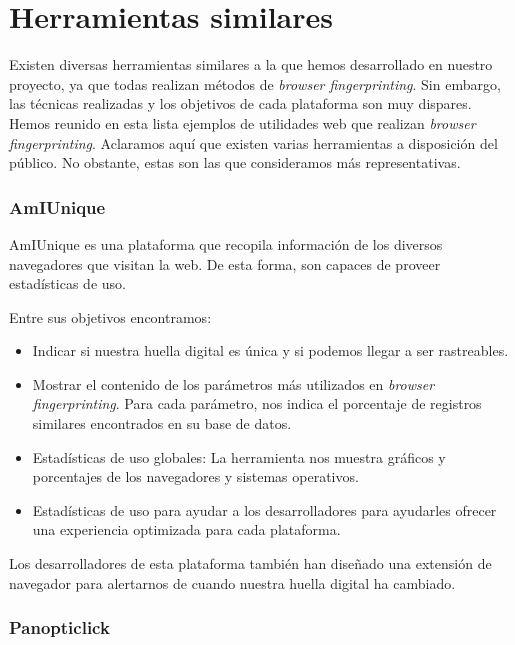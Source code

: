 \section{Herramientas similares}

Existen diversas herramientas similares a la que hemos desarrollado en nuestro proyecto, ya que todas realizan métodos de \textit{browser fingerprinting}. Sin embargo, las técnicas realizadas y los objetivos de cada plataforma son muy dispares. Hemos reunido en esta lista ejemplos de utilidades web que realizan \textit{browser fingerprinting}. Aclaramos aquí que existen varias herramientas a disposición del público. No obstante, estas son las que consideramos más representativas. \par

\subsubsection{AmIUnique}

AmIUnique\cite{amiunique} es una plataforma que recopila información de los diversos navegadores que visitan la web. De esta forma, son capaces de proveer estadísticas de uso. \par 
Entre sus objetivos encontramos:
\begin{itemize}
	\item Indicar si nuestra huella digital es única y si podemos llegar a ser rastreables.
	\item Mostrar el contenido de los parámetros más utilizados en \textit{browser fingerprinting}. Para cada parámetro, nos indica el porcentaje de registros similares encontrados en su base de datos.
	\item Estadísticas de uso globales: La herramienta nos muestra gráficos y porcentajes de los navegadores y sistemas operativos.
	\item Estadísticas de uso para ayudar a los desarrolladores para ayudarles ofrecer una experiencia optimizada para cada plataforma.
\end{itemize}

Los desarrolladores de esta plataforma también han diseñado una extensión de navegador para alertarnos de cuando nuestra huella digital ha cambiado. \par 

\subsubsection{Panopticlick}


